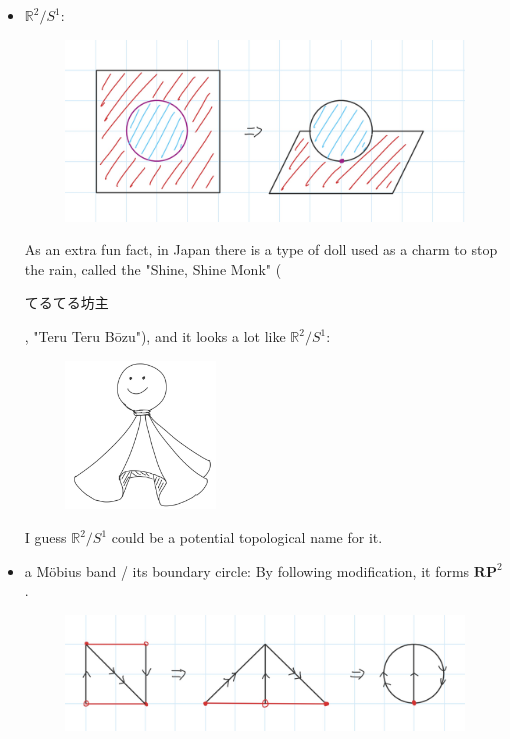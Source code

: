 \documentclass{article}
\begin{document}
\begin{itemize}
    \hfil

    \item $\mathbb{R}^2/S^1$:
    
    \begin{figure}[h!]
        \begin{center}
            \includegraphics*[width=120mm]{4.jpg}
        \end{center}
    \end{figure}

    As an extra fun fact, in Japan there is a type of doll used as a charm to stop the rain, called the "Shine, Shine Monk" (
        \begin{CJK}{UTF8}{min}
            てるてる坊主
        \end{CJK}
    , "Teru Teru Bōzu"), and it looks a lot like $\mathbb{R}^2/S^1$:
    \begin{figure}[h!]
        \begin{center}
            \includegraphics*[width=40mm]{haru.jpg}
        \end{center}
    \end{figure}

    I guess $\mathbb{R}^2/S^1$ could be a potential topological name for it.

    \break

    \item a Möbius band / its boundary circle: By following modification, it forms $\mathbf{RP}^2$.
    
    \begin{figure}[h!]
        \begin{center}
            \includegraphics*[width=120mm]{5.jpg}
        \end{center}
    \end{figure}
\end{itemize}
\end{document}
